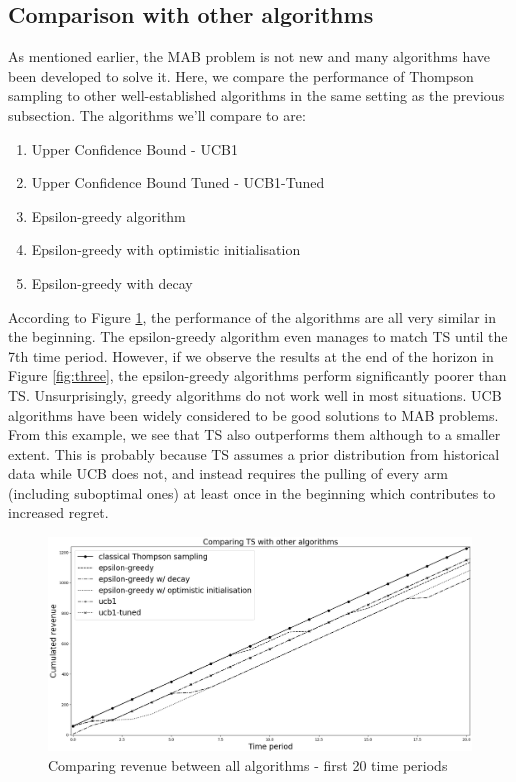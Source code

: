 \documentclass[a4paper]{article}
\begin{document}
\subsection{Comparison with other algorithms}
As mentioned earlier, the MAB problem is not new and many algorithms have been developed to solve it. Here, we compare the performance of Thompson sampling to other well-established algorithms in the same setting as the previous subsection. The algorithms we'll compare to are:
\begin{enumerate}
	\item Upper Confidence Bound - UCB1
	\item Upper Confidence Bound Tuned - UCB1-Tuned
	\item Epsilon-greedy algorithm
	\item Epsilon-greedy with optimistic initialisation
	\item Epsilon-greedy with decay	
\end{enumerate}
According to Figure \ref{fig:two}, the performance of the algorithms are all very similar in the beginning. The epsilon-greedy algorithm even manages to match TS until the 7th time period. However, if we observe the results at the end of the horizon in Figure \ref{fig:three}, the epsilon-greedy algorithms perform significantly poorer than TS. Unsurprisingly, greedy algorithms do not work well in most situations. UCB algorithms have been widely considered to be good solutions to MAB problems. From this example, we see that TS also outperforms them although to a smaller extent. This is probably because TS assumes a prior distribution from historical data while UCB does not, and instead requires the pulling of every arm (including suboptimal ones) at least once in the beginning which contributes to increased regret.
\begin{figure}[h]
	\centering
	\includegraphics[width=1\textwidth]{Figure_1-3.png}
	\caption{\label{fig:two}Comparing revenue between all algorithms - first 20 time periods}
\end{figure}
\end{document}
